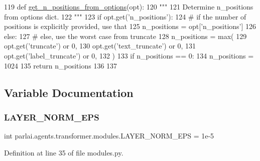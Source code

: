 \begin{DoxyCode}
119 \textcolor{keyword}{def }\hyperlink{namespaceparlai_1_1agents_1_1transformer_1_1modules_ab67607512c597ddd54f2b60a1a1eaf4c}{get\_n\_positions\_from\_options}(opt):
120     \textcolor{stringliteral}{"""}
121 \textcolor{stringliteral}{    Determine n\_positions from options dict.}
122 \textcolor{stringliteral}{    """}
123     \textcolor{keywordflow}{if} opt.get(\textcolor{stringliteral}{'n\_positions'}):
124         \textcolor{comment}{# if the number of positions is explicitly provided, use that}
125         n\_positions = opt[\textcolor{stringliteral}{'n\_positions'}]
126     \textcolor{keywordflow}{else}:
127         \textcolor{comment}{# else, use the worst case from truncate}
128         n\_positions = max(
129             opt.get(\textcolor{stringliteral}{'truncate'}) \textcolor{keywordflow}{or} 0,
130             opt.get(\textcolor{stringliteral}{'text\_truncate'}) \textcolor{keywordflow}{or} 0,
131             opt.get(\textcolor{stringliteral}{'label\_truncate'}) \textcolor{keywordflow}{or} 0,
132         )
133         \textcolor{keywordflow}{if} n\_positions == 0:
134             n\_positions = 1024
135     \textcolor{keywordflow}{return} n\_positions
136 
137 
\end{DoxyCode}


\subsection{Variable Documentation}
\mbox{\label{namespaceparlai_1_1agents_1_1transformer_1_1modules_afb85e0862dd867aee20a92e26aa29f58}} 
\subsubsection{\texorpdfstring{L\+A\+Y\+E\+R\+\_\+\+N\+O\+R\+M\+\_\+\+E\+PS}{LAYER\_NORM\_EPS}}
{\footnotesize\ttfamily int parlai.\+agents.\+transformer.\+modules.\+L\+A\+Y\+E\+R\+\_\+\+N\+O\+R\+M\+\_\+\+E\+PS = 1e-\/5}



Definition at line 35 of file modules.\+py.

